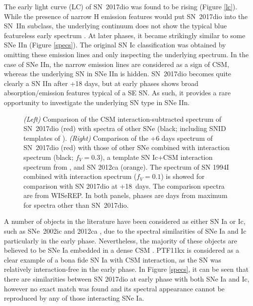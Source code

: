 \documentclass[twocolumn]{aastex61}
\begin{document}
The early light curve (LC) of SN~2017dio was found to be rising (Figure \ref{lc}).
While the presence of narrow H emission features would put SN~2017dio into the SN~IIn subclass, the underlying continuum does not show the typical blue featureless early spectrum \citep[see e.g.][]{kiewe12,taddia13}. At later phases, it became strikingly similar to some SNe IIn (Figure \ref{specs}).
The original SN Ic classification was obtained by omitting these emission lines and only inspecting the underlying spectrum. In the case of SNe IIn, the narrow emission lines are considered as a sign of CSM, whereas the underlying SN in SNe IIn is hidden. SN~2017dio becomes quite clearly a SN IIn after +18 days, but at early phases shows broad absorption/emission features typical of a SE SN. As such, it provides a rare opportunity to investigate the {underlying} SN type {in} SNe IIn. 

\begin{figure*}
\centering
\caption{
\textit{(Left)} 
{Comparison of {the} CSM interaction-subtracted spectrum of SN~2017dio (red) with {spectra of other} SNe (black; including SNID templates of \citealt{modjaz14}).}
\textit{(Right)} 
{Comparison of the +6 days spectrum of SN~2017dio (red) with those of {other} SNe combined with interaction spectrum (black; $f_V = 0.3$), a template SN Ic+CSM interaction spectrum from \citet[][green]{leloudas15}, and SN 2012ca (orange).}
The spectrum of SN 1994I combined with interaction spectrum ($f_V = 0.1$) is showed for comparison with SN 2017dio at +18~days.
The comparison spectra are from WISeREP.
{In both panels, phases are days from maximum for spectra other than SN~2017dio.}
}
\label{specsub}
\end{figure*}

{
A number of objects in the literature have been considered as either SN Ia or Ic, such as SNe~2002ic \citep{hamuy03,benetti06} and 2012ca \citep{fox15,inserra16}, due to the spectral similarities of SNe Ia and Ic particularly in the early phase.
Nevertheless, the majority of these objects are believed to be SNe Ia embedded in a dense CSM \citep{silverman13,leloudas15}.
{PTF11kx \citep{dilday12} is considered as a clear example of a bona fide SN Ia with CSM interaction, as the SN was relatively interaction-free in the early phase.}
In Figure \ref{specs}, it can be seen that there are similarities between SN 2017dio at early phase with both SNe Ia and Ic, however no exact match was found and its spectral {appearance} cannot be reproduced by any of those interacting SNe Ia.
}
\end{document}
